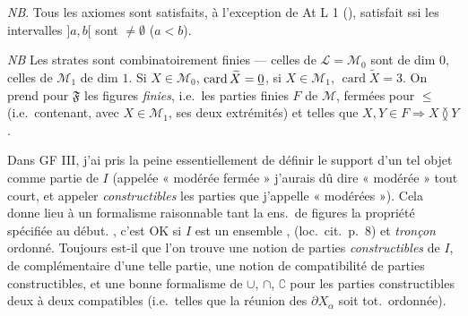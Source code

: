 \documentclass[11pt,a4paper]{article}
\begin{document}
\emph{NB}. Tous les axiomes sont satisfaits, à l'exception de At L 1 (), satisfait ssi les intervalles $]a,b[$ sont $\neq \emptyset$ ($a < b$).

\emph{NB} Les strates sont combinatoirement finies — celles de $\mathcal{L} = \mathcal{M}_0$ sont de dim $0$, celles de $\mathcal{M}_1$ de dim $1$. Si $X \in \mathcal{M}_0$,  $\operatorname{card} \widetilde{X} = \uncertain{0}$, si $X \in \mathcal{M}_1$, $\operatorname{card} \widetilde{X} = 3$. On prend pour $\mathfrak{F}$ les figures \emph{finies}, i.e.\ les parties finies $F$ de $\mathcal{M}$,  fermées pour $\leq$ (i.e.\ contenant, avec $X \in \mathcal{M}_1$, ses deux extrémités) et telles que $X, Y \in F \Rightarrow X \between Y$.



Dans GF III, j'ai pris la peine essentiellement de définir le support d'un tel objet comme partie de $I$ (appelée \struck{\ill{}} « modérée fermée »  j'aurais dû dire « modérée » tout court, et appeler \emph{constructibles} les parties que j'appelle « modérées »). Cela donne lieu à un formalisme raisonnable tant  la   ens.\ de figures  la propriété spécifiée au début.     \ill{}, c'est OK si $I$ est un ensemble \ill{},  \ill{} (loc.\ cit.\ p.\ 8) et  \emph{tronçon} ordonné. Toujours est-il que l'on trouve une notion de parties \emph{constructibles} de $I$, de complémentaire d'une telle partie,  une notion de compatibilité de parties constructibles, et une bonne formalisme de $\cup$, $\cap$, $\complement$ pour les parties constructibles  deux à deux  compatibles (i.e.\ telles que la réunion des $\partial X_\alpha$ soit tot.\ ordonnée).
\end{document}
